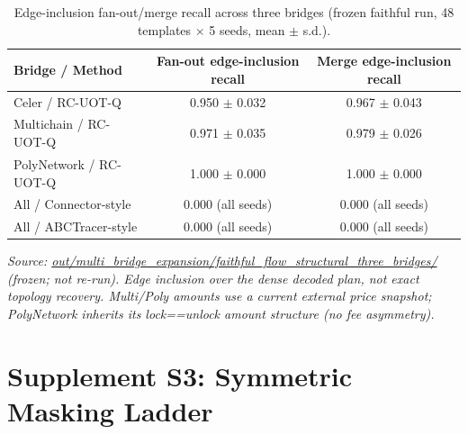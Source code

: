 \documentclass[journal]{IEEEtran}
\begin{document}
\begin{table}[!t]
\caption{Edge-inclusion fan-out/merge recall across three bridges (frozen faithful run, 48 templates $\times$ 5 seeds, mean $\pm$ s.d.).}
\label{tab:S2}
\centering
\begin{tabular}{lcc}
\toprule
Bridge / Method & Fan-out edge-inclusion recall & Merge edge-inclusion recall \\
\midrule
Celer / RC-UOT-Q & 0.950 $\pm$ 0.032 & 0.967 $\pm$ 0.043 \\
Multichain / RC-UOT-Q & 0.971 $\pm$ 0.035 & 0.979 $\pm$ 0.026 \\
PolyNetwork / RC-UOT-Q & 1.000 $\pm$ 0.000 & 1.000 $\pm$ 0.000 \\
All / Connector-style & 0.000 (all seeds) & 0.000 (all seeds) \\
All / ABCTracer-style & 0.000 (all seeds) & 0.000 (all seeds) \\
\bottomrule
\end{tabular}
\end{table}

\emph{Source: \url{out/multi_bridge_expansion/faithful_flow_structural_three_bridges/} (frozen; not re-run). Edge inclusion over the dense decoded plan, not exact topology recovery. Multi/Poly amounts use a current external price snapshot; PolyNetwork inherits its lock==unlock amount structure (no fee asymmetry).}

\section*{Supplement S3: Symmetric Masking Ladder}
\end{document}
